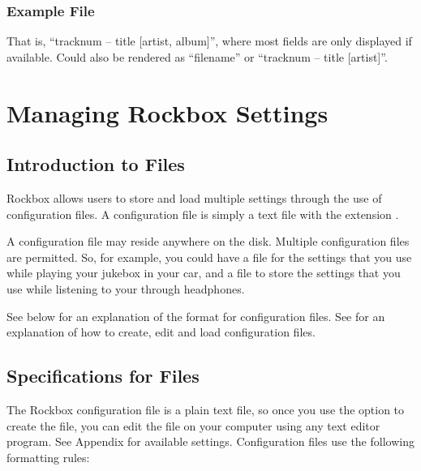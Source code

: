 \subsubsection{Example File}
\begin{example}
\end{example}
That is, ``tracknum -- title [artist, album]'', where most fields are only
displayed if available. Could also be rendered as ``filename'' or ``tracknum --
title [artist]''.

%  

\section{\label{ref:manage_settings}Managing Rockbox Settings}

\subsection{Introduction to  Files}
Rockbox allows users to store and load multiple settings through the use of
configuration files. A configuration file is simply a text file with the
extension .

A configuration file may reside anywhere on the disk. Multiple
configuration files are permitted. So, for example, you could have
a  file for the settings that you use while playing your
jukebox in your car, and a  file to store the
settings that you use while listening to your \dap{} through headphones.

See  below for an explanation of the format 
for configuration files. See  for an
explanation of how to create, edit and load configuration files.

\subsection{\label{ref:cfg_specs}Specifications for  Files}

The Rockbox configuration file is a plain text file, so once you use the 
 option to create the file, you can edit the file on 
your computer using any text editor program. See
Appendix  for available settings. Configuration 
files use the following formatting rules: %

